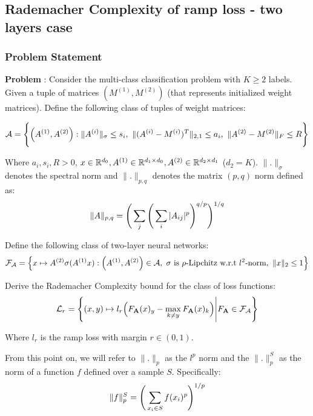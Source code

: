 \newpage
\subsection{Rademacher Complexity of ramp loss - two layers case}
\subsubsection{Problem Statement}
\textbf{Problem} : Consider the multi-class classification problem with $K \ge 2$ labels. Given a tuple of matrices $(M^{(1)}, M^{(2)})$ (that represents initialized weight matrices). Define the following class of tuples of weight matrices:

\begin{align*}
    \mathcal{A} = \Bigg\{ 
        \Big( 
            A^{(1)}, A^{(2)}
         \Big) : \|A^{(i)}\|_\sigma \le s_i, \ \| (A^{(i)} - M^{(i)})^T \|_{2, 1} \le a_i, \ \| A^{(2)} - M^{(2)} \|_F \le R
     \Bigg\}
\end{align*}

\noindent Where $a_i, s_i, R > 0$, $x\in \mathbb{R}^{d_0}, A^{(1)}\in\mathbb{R}^{d_1\times d_0}, A^{(2)}\in \mathbb{R}^{d_2\times d_1}$ ($d_2=K$). $\|.\|_\sigma$ denotes the spectral norm and $\|.\|_{p, q}$ denotes the matrix $(p, q)$ norm defined as:
\begin{align*}
    \|A\|_{p, q} = \Bigg( \sum_j\Bigg( \sum_{i}|A_{ij}|^p \Bigg)^{q/p} \Bigg)^{1/q}
\end{align*}    

\noindent Define the following class of two-layer neural networks:
\begin{align*}
    \mathcal{F}_\mathcal{A} = \Big\{ 
        x\mapsto A^{(2)}\sigma(A^{(1)}x) : \Big( A^{(1)}, A^{(2)} \Big)\in\mathcal{A}, \ \sigma \text{ is } \rho\text{-Lipchitz w.r.t } l^2\text{-norm}, \ \|x\|_2 \le 1
     \Big\}
\end{align*}

\noindent Derive the Rademacher Complexity bound for the class of loss functions:
\begin{align*}
    \mathcal{L}_r = \Bigg\{ 
        (x, y) \mapsto l_r\Big( 
            F_{\bf A}(x)_y - \max_{k\ne y}F_{\bf A}(x)_k
         \Big) \Bigg| F_{\bf A} \in \mathcal{F}_\mathcal{A}
     \Bigg\}
\end{align*}

\noindent Where $l_r$ is the ramp loss with margin $r\in(0,1)$.

\noindent \color{red}
From this point on, we will refer to $\|.\|_p$ as the $l^p$ norm and the $\|.\|_p^S$ as the norm of a function $f$ defined over a sample $S$. Specifically:
\begin{align*}
    \|f\|_p^S = \Bigg( 
        \sum_{x_i \in S} f(x_i) ^p
     \Bigg)^{1/p}
\end{align*}
\color{black}

